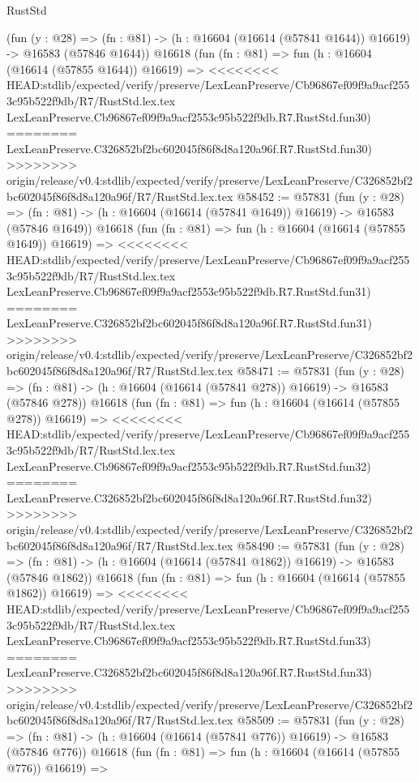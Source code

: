 \begin{lexlean}{RustStd}
\begin{coremodule}
{\begin{coremodule}
{{{{{{{{{{{{{{{{{{{{{{{{{{{{{{{{{{{{{{{{{{{{{{{{{{{{{{{    (fun (y : @28) =>
    (fn : @81) -> (h : @16604 (@16614 (@57841 @1644)) @16619) -> @16583 (@57846 @1644))
    @16618
    (fun (fn : @81) =>
    fun (h : @16604 (@16614 (@57855 @1644)) @16619) =>
<<<<<<<< HEAD:stdlib/expected/verify/preserve/LexLeanPreserve/Cb96867ef09f9a9acf2553c95b522f9db/R7/RustStd.lex.tex
    LexLeanPreserve.Cb96867ef09f9a9acf2553c95b522f9db.R7.RustStd.fun30)
========
    LexLeanPreserve.C326852bf2bc602045f86f8d8a120a96f.R7.RustStd.fun30)
>>>>>>>> origin/release/v0.4:stdlib/expected/verify/preserve/LexLeanPreserve/C326852bf2bc602045f86f8d8a120a96f/R7/RustStd.lex.tex
@58452 := @57831
    (fun (y : @28) =>
    (fn : @81) -> (h : @16604 (@16614 (@57841 @1649)) @16619) -> @16583 (@57846 @1649))
    @16618
    (fun (fn : @81) =>
    fun (h : @16604 (@16614 (@57855 @1649)) @16619) =>
<<<<<<<< HEAD:stdlib/expected/verify/preserve/LexLeanPreserve/Cb96867ef09f9a9acf2553c95b522f9db/R7/RustStd.lex.tex
    LexLeanPreserve.Cb96867ef09f9a9acf2553c95b522f9db.R7.RustStd.fun31)
========
    LexLeanPreserve.C326852bf2bc602045f86f8d8a120a96f.R7.RustStd.fun31)
>>>>>>>> origin/release/v0.4:stdlib/expected/verify/preserve/LexLeanPreserve/C326852bf2bc602045f86f8d8a120a96f/R7/RustStd.lex.tex
@58471 := @57831
    (fun (y : @28) =>
    (fn : @81) -> (h : @16604 (@16614 (@57841 @278)) @16619) -> @16583 (@57846 @278))
    @16618
    (fun (fn : @81) =>
    fun (h : @16604 (@16614 (@57855 @278)) @16619) =>
<<<<<<<< HEAD:stdlib/expected/verify/preserve/LexLeanPreserve/Cb96867ef09f9a9acf2553c95b522f9db/R7/RustStd.lex.tex
    LexLeanPreserve.Cb96867ef09f9a9acf2553c95b522f9db.R7.RustStd.fun32)
========
    LexLeanPreserve.C326852bf2bc602045f86f8d8a120a96f.R7.RustStd.fun32)
>>>>>>>> origin/release/v0.4:stdlib/expected/verify/preserve/LexLeanPreserve/C326852bf2bc602045f86f8d8a120a96f/R7/RustStd.lex.tex
@58490 := @57831
    (fun (y : @28) =>
    (fn : @81) -> (h : @16604 (@16614 (@57841 @1862)) @16619) -> @16583 (@57846 @1862))
    @16618
    (fun (fn : @81) =>
    fun (h : @16604 (@16614 (@57855 @1862)) @16619) =>
<<<<<<<< HEAD:stdlib/expected/verify/preserve/LexLeanPreserve/Cb96867ef09f9a9acf2553c95b522f9db/R7/RustStd.lex.tex
    LexLeanPreserve.Cb96867ef09f9a9acf2553c95b522f9db.R7.RustStd.fun33)
========
    LexLeanPreserve.C326852bf2bc602045f86f8d8a120a96f.R7.RustStd.fun33)
>>>>>>>> origin/release/v0.4:stdlib/expected/verify/preserve/LexLeanPreserve/C326852bf2bc602045f86f8d8a120a96f/R7/RustStd.lex.tex
@58509 := @57831
    (fun (y : @28) =>
    (fn : @81) -> (h : @16604 (@16614 (@57841 @776)) @16619) -> @16583 (@57846 @776))
    @16618
    (fun (fn : @81) =>
    fun (h : @16604 (@16614 (@57855 @776)) @16619) =>
}}}}}}}}}}}}}}}}}}}}}}}}}}}}}}}}}}}}}}}}}}}}}}}}}}}}}}}
\end{coremodule}}
\end{coremodule}
\end{lexlean}

